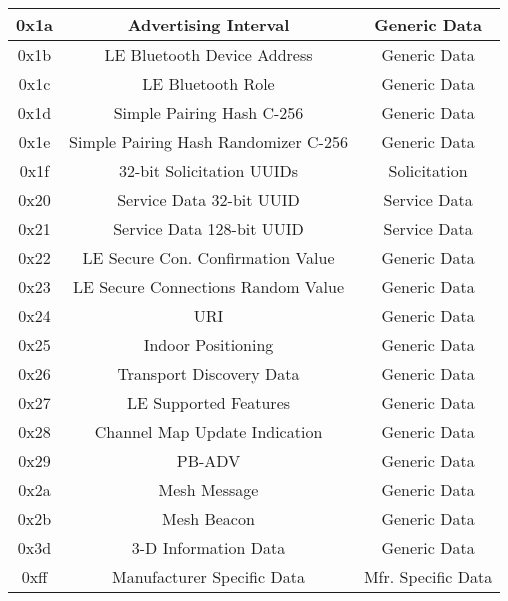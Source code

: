 \begin{longtable}{c c c}
		 0x1a &	Advertising Interval &	Generic Data \\ \hline
		 0x1b &	LE Bluetooth Device Address &	Generic Data \\ \hline
		 0x1c &	LE Bluetooth Role &	Generic Data \\ \hline
		 0x1d &	Simple Pairing Hash C-256 &	Generic Data \\ \hline
		 0x1e &	Simple Pairing Hash Randomizer C-256 &	Generic Data \\ \hline
		 0x1f &	32-bit Solicitation UUIDs &	Solicitation \\ \hline
		 0x20 &	Service Data 32-bit UUID &	Service Data \\ \hline
		 0x21 &	Service Data 128-bit UUID &	Service Data \\ \hline
		 0x22 &	LE Secure Con. Confirmation Value &	Generic Data \\ \hline
		 0x23 &	LE Secure Connections Random Value &	Generic Data \\ \hline
		 0x24 &	URI &	Generic Data \\ \hline
		 0x25 &	Indoor Positioning &	Generic Data \\ \hline
		 0x26 &	Transport Discovery Data &	Generic Data \\ \hline
		 0x27 &	LE Supported Features &	Generic Data \\ \hline
		 0x28 &	Channel Map Update Indication &	Generic Data \\ \hline
		 0x29 &	PB-ADV &	Generic Data \\ \hline
		 0x2a &	Mesh Message &	Generic Data \\ \hline
		 0x2b &	Mesh Beacon &	Generic Data \\ \hline
		 0x3d &	3-D Information Data &	Generic Data \\ \hline
		 0xff &	Manufacturer Specific Data &	Mfr. Specific Data \\  \hline
\end{longtable}


